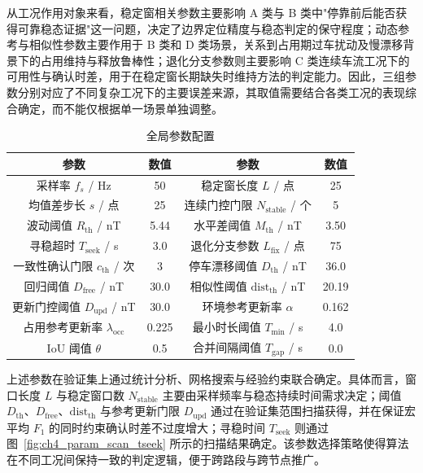 \documentclass{xdupgthesis}
\begin{document}
从工况作用对象来看，稳定窗相关参数主要影响 A 类与 B 类中"停靠前后能否获得可靠稳态证据"这一问题，决定了边界定位精度与稳态判定的保守程度；动态参考与相似性参数主要作用于 B 类和 D 类场景，关系到占用期过车扰动及慢漂移背景下的占用维持与释放鲁棒性；退化分支参数则主要影响 C 类连续车流工况下的可用性与确认时差，用于在稳定窗长期缺失时维持方法的判定能力。因此，三组参数分别对应了不同复杂工况下的主要误差来源，其取值需要结合各类工况的表现综合确定，而不能仅根据单一场景单独调整。

\begin{table}[!htbp]
    \centering
    \caption{全局参数配置}
    \label{tab:ch4_global_params}
    \small
    \setlength{\tabcolsep}{6pt}
    \begin{tabular}{cc|cc}
        \hline
        参数 & 数值 & 参数 & 数值 \\
        \hline
        采样率 $f_s$ / Hz & 50 & 稳定窗长度 $L$ / 点 & 25 \\
        均值差步长 $s$ / 点 & 25 & 连续门控门限 $N_{\mathrm{stable}}$ / 个 & 5 \\
        波动阈值 $R_{\mathrm{th}}$ / nT & 5.44 & 水平差阈值 $M_{\mathrm{th}}$ / nT & 3.50 \\
        寻稳超时 $T_{\mathrm{seek}}$ / s & 3.0 & 退化分支参数 $L_{\mathrm{fix}}$ / 点 & 75 \\
        一致性确认门限 $c_{\mathrm{th}}$ / 次 & 3 & 停车漂移阈值 $D_{\mathrm{th}}$ / nT & 36.0 \\
        回归阈值 $D_{\mathrm{free}}$ / nT & 30.0 & 相似性阈值 $\mathrm{dist}_{\mathrm{th}}$ / nT & 20.19 \\
        更新门控阈值 $D_{\mathrm{upd}}$ / nT & 30.0 & 环境参考更新率 $\alpha$ & 0.162 \\
        占用参考更新率 $\lambda_{\mathrm{occ}}$ & 0.225 & 最小时长阈值 $T_{\min}$ / s & 4.0 \\
        IoU 阈值 $\theta$ & 0.5 & 合并间隔阈值 $T_{\mathrm{gap}}$ / s & 0.0 \\
        \hline
    \end{tabular}
\end{table}

上述参数在验证集上通过统计分析、网格搜索与经验约束联合确定。具体而言，窗口长度 $L$ 与稳定窗口数 $N_{\mathrm{stable}}$ 主要由采样频率与稳态持续时间需求决定；阈值 $D_{\mathrm{th}}$、$D_{\mathrm{free}}$、$\mathrm{dist}_{\mathrm{th}}$ 与参考更新门限 $D_{\mathrm{upd}}$ 通过在验证集范围扫描获得，并在保证宏平均 $F_1$ 的同时约束确认时差不过度增大；寻稳时间 $T_{\mathrm{seek}}$ 则通过图~\ref{fig:ch4_param_scan_tseek} 所示的扫描结果确定。该参数选择策略使得算法在不同工况间保持一致的判定逻辑，便于跨路段与跨节点推广。
\end{document}
